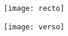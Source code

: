 \documentclass[a4paper]{article}
\begin{document}
\begin{center}
\texttt{[image: recto]}
\end{center}

\begin{center}
\texttt{[image: verso]}
\end{center}
\end{document}
